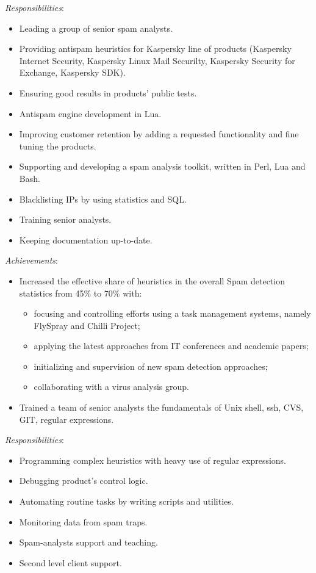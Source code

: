 \documentclass[11pt,a4paper,sans]{moderncv}        %
\newcommand{\responsibilities}[1]{ \emph{Responsibilities}:\begin{itemize} #1\end{itemize}}
\newcommand{\achievements}[1]{ \emph{Achievements}:\begin{itemize} #1\end{itemize}}
\begin{document}
 {
    \responsibilities {
        \item Leading a group of senior spam analysts.
        \item Providing antispam heuristics for Kaspersky line of products (Kaspersky Internet Security, Kaspersky Linux Mail Securilty, Kaspersky Security for Exchange, Kaspersky SDK).
        \item Ensuring good results in products' public tests.
        \item Antispam engine development in Lua.
        \item Improving customer retention by adding a requested functionality and fine tuning the products.
        \item Supporting and developing a spam analysis toolkit, written in Perl, Lua and Bash.
        \item Blacklisting IPs by using statistics and SQL.
        \item Training senior analysts.
        \item Keeping documentation up-to-date.
    }
    \achievements {
        \item Increased the effective share of heuristics in the overall Spam detection statistics from 45\% to 70\% with:
        \begin{itemize}
            \item focusing and controlling efforts using a task management systems, namely FlySpray and Chilli Project;
            \item applying the latest approaches from IT conferences and academic papers;
            \item initializing and supervision of new spam detection approaches;
            \item collaborating with a virus analysis group.
        \end{itemize}
        \item Trained a team of senior analysts the fundamentals of Unix shell, ssh, CVS, GIT, regular expressions.
    }
}

 {
    \responsibilities {
        \item Programming complex heuristics with heavy use of regular expressions.
        \item Debugging product's control logic.
        \item Automating routine tasks by writing scripts and utilities.
        \item Monitoring data from spam traps.
        \item Spam-analysts support and teaching.
        \item Second level client support.
    }
}
\end{document}
